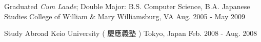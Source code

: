 

\begin{cventries}

  \cventry
    {Graduated \emph{Cum Laude}; Double Major: B.S. Computer Science, B.A. Japanese Studies} %
    {College of William \& Mary} %
    {Williamsburg, VA} %
    {Aug. 2005 - May 2009} %
    {
      \begin{cvitems} %
      \end{cvitems}
    }

  \cventry
    {Study Abroad} %
    {Keio University ( 慶應義塾 )} %
    {Tokyo, Japan} %
    {Feb. 2008 - Aug. 2008} %
    {
      \begin{cvitems} %
      \end{cvitems}
    }

\end{cventries}
